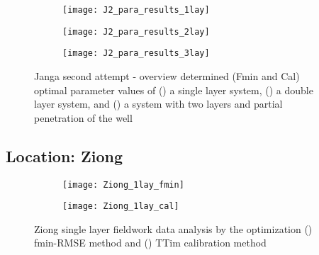 \begin{figure}[h!]
	\centering
	\begin{subfigure}[b]{\linewidth}
		\centering\texttt{[image: J2\_para\_results\_1lay]}
		\captionsetup{justification=centering}		
		\caption{\label{fig:J2_para_results_1lay}}
		\end{subfigure}\vfill
	\begin{subfigure}[b]{\linewidth}
		\centering\texttt{[image: J2\_para\_results\_2lay]}
		\captionsetup{justification=centering}		
		\caption{\label{fig:J2_para_results_2lay}}
		\end{subfigure}
	\begin{subfigure}[b]{\linewidth}
		\centering\texttt{[image: J2\_para\_results\_3lay]}
		\captionsetup{justification=centering}		
		\caption{\label{fig:J2_para_results_3lay}}
		\end{subfigure}		
	\captionsetup{justification=centering}	
	\caption{Janga second attempt - overview determined (Fmin and Cal) optimal parameter values of () a single layer system, () a double layer system, and () a system with two layers and partial penetration of the well} 
	\label{fig:J2_para_results}
\end{figure} 


\clearpage\subsection{Location: Ziong}
\label{subsec:Ziong_overview}

\begin{figure}[h!]
	\centering
	\begin{subfigure}[b]{0.65\linewidth}
		\centering\texttt{[image: Ziong\_1lay\_fmin]}
		\captionsetup{justification=centering}		
		\caption{\label{fig:Ziong_1lay_fmin}}
		\end{subfigure}\vfill
	\begin{subfigure}[b]{0.65\linewidth}
		\centering\texttt{[image: Ziong\_1lay\_cal]}
		\captionsetup{justification=centering}		
		\caption{\label{fig:Ziong_1lay_cal}}
		\end{subfigure}
	\captionsetup{justification=centering}	
	\caption{Ziong single layer fieldwork data analysis by the optimization () fmin-RMSE method and () TTim calibration method} 
	\label{fig:Ziong_1lay_analysis}
\end{figure} 


